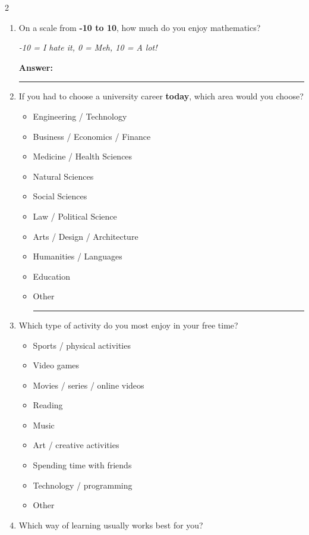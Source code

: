 \begin{multicols}{2}
\begin{enumerate}
		\textbf{Answer:} \rule{3cm}{0.4pt} minutes
		
		\item On a scale from \textbf{-10 to 10}, how much do you enjoy mathematics?
		
		\textit{-10 = I hate it, 0 = Meh, 10 = A lot!}
		
		\textbf{Answer:} \rule{3cm}{0.4pt}
		
		\item If you had to choose a university career \textbf{today}, which area would you choose?
		
		\begin{itemize}[label={$\square$}, leftmargin=2em]
			\item Engineering / Technology
			\item Business / Economics / Finance
			\item Medicine / Health Sciences
			\item Natural Sciences
			\item Social Sciences
			\item Law / Political Science
			\item Arts / Design / Architecture
			\item Humanities / Languages
			\item Education
			\item Other \rule{4cm}{0.4pt}
		\end{itemize}
		
		\item Which type of activity do you most enjoy in your free time?
		
		\begin{itemize}[label={$\square$}, leftmargin=2em]
			\item Sports / physical activities
			\item Video games
			\item Movies / series / online videos
			\item Reading
			\item Music
			\item Art / creative activities
			\item Spending time with friends
			\item Technology / programming
			\item Other
		\end{itemize}
		
		\item Which way of learning usually works best for you?
		

\end{enumerate}
\end{multicols}
